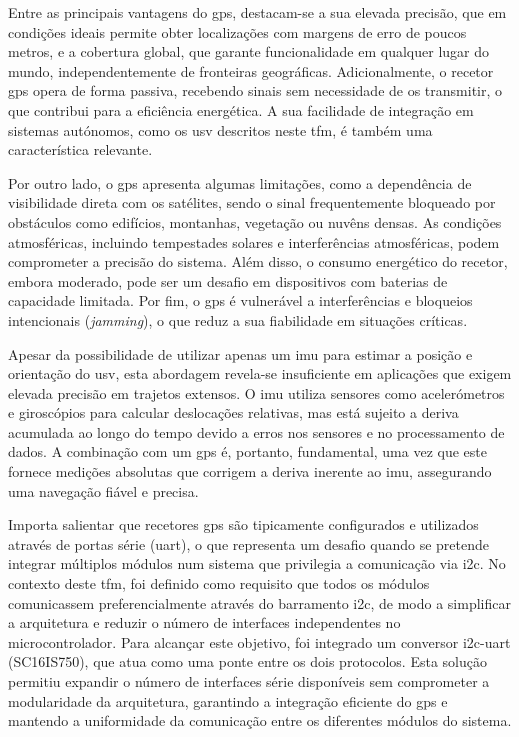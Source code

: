 Entre as principais vantagens do \gls{gps}, destacam-se a sua elevada precisão, que em condições ideais permite obter localizações com margens de erro de poucos metros, e a cobertura global, que garante funcionalidade em qualquer lugar do mundo, independentemente de fronteiras geográficas. Adicionalmente, o recetor \gls{gps} opera de forma passiva, recebendo sinais sem necessidade de os transmitir, o que contribui para a eficiência energética. A sua facilidade de integração em sistemas autónomos, como os \gls{usv} descritos neste \gls{tfm}, é também uma característica relevante.

Por outro lado, o \gls{gps} apresenta algumas limitações, como a dependência de visibilidade direta com os satélites, sendo o sinal frequentemente bloqueado por obstáculos como edifícios, montanhas, vegetação ou nuvêns densas. As condições atmosféricas, incluindo tempestades solares e interferências atmosféricas, podem comprometer a precisão do sistema. Além disso, o consumo energético do recetor, embora moderado, pode ser um desafio em dispositivos com baterias de capacidade limitada. Por fim, o \gls{gps} é vulnerável a interferências e bloqueios intencionais (\emph{jamming}), o que reduz a sua fiabilidade em situações críticas.

Apesar da possibilidade de utilizar apenas um \gls{imu} para estimar a posição e orientação do \gls{usv}, esta abordagem revela-se insuficiente em aplicações que exigem elevada precisão em trajetos extensos. O \gls{imu} utiliza sensores como acelerómetros e giroscópios para calcular deslocações relativas, mas está sujeito a deriva acumulada ao longo do tempo devido a erros nos sensores e no processamento de dados. A combinação com um \gls{gps} é, portanto, fundamental, uma vez que este fornece medições absolutas que corrigem a deriva inerente ao \gls{imu}, assegurando uma navegação fiável e precisa.  

Importa salientar que recetores \gls{gps} são tipicamente configurados e utilizados através de portas série (\gls{uart}), o que representa um desafio quando se pretende integrar múltiplos módulos num sistema que privilegia a comunicação via \gls{i2c}. No contexto deste \gls{tfm}, foi definido como requisito que todos os módulos comunicassem preferencialmente através do barramento \gls{i2c}, de modo a simplificar a arquitetura e reduzir o número de interfaces independentes no microcontrolador. Para alcançar este objetivo, foi integrado um conversor \gls{i2c}-\gls{uart} (SC16IS750), que atua como uma ponte entre os dois protocolos. Esta solução permitiu expandir o número de interfaces série disponíveis sem comprometer a modularidade da arquitetura, garantindo a integração eficiente do \gls{gps} e mantendo a uniformidade da comunicação entre os diferentes módulos do sistema.  

